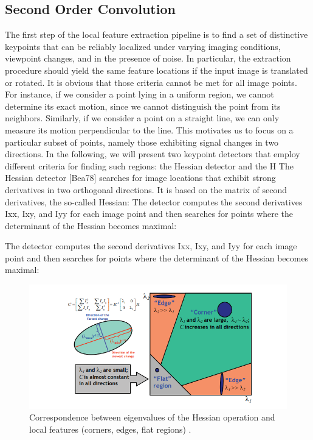 \subsection{Second Order Convolution}
The first step of the local feature extraction pipeline is to find a set of distinctive
keypoints that can be reliably localized under varying imaging conditions, viewpoint
changes, and in the presence of noise. In particular, the extraction procedure should
yield the same feature locations if the input image is translated or rotated. It is
obvious that those criteria cannot be met for all image points. For instance, if we
consider a point lying in a uniform region, we cannot determine its exact motion,
since we cannot distinguish the point from its neighbors. Similarly, if we consider a
point on a straight line, we can only measure its motion perpendicular to the line.
This motivates us to focus on a particular subset of points, namely those exhibiting
signal changes in two directions. In the following, we will present two keypoint
detectors that employ different criteria for finding such regions: the Hessian detector
and the H
The Hessian detector [Bea78] searches for image locations that exhibit strong derivatives
in two orthogonal directions. It is based on the matrix of second derivatives,
the so-called Hessian:
The detector computes the second derivatives Ixx, Ixy, and Iyy for each image point
and then searches for points where the determinant of the Hessian becomes maximal:

The detector computes the second derivatives Ixx, Ixy, and Iyy for each image point
and then searches for points where the determinant of the Hessian becomes maximal:

\begin{figure}[!tbh] 
	\centering
	\includegraphics[width=1\textwidth]{hessian_app.png} 
	\caption{Correspondence between eigenvalues of the Hessian operation and local features (corners, edges, flat regions) \cite{grauman2011visual}.}
	\label{fig:hessian_app}
\end{figure}

